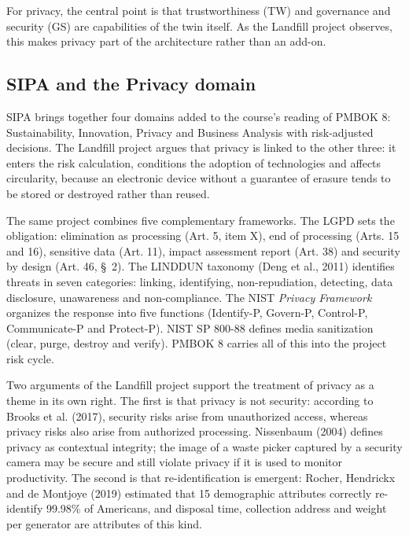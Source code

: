 \documentclass[12pt,a4paper,article,oneside,brazil,english]{abntex2}
\begin{document}
For privacy, the central point is that trustworthiness (TW) and governance and security (GS) are capabilities of the twin itself. As the Landfill project observes, this makes privacy part of the architecture rather than an add-on.

\subsection{SIPA and the Privacy domain}

SIPA brings together four domains added to the course's reading of PMBOK 8: Sustainability, Innovation, Privacy and Business Analysis with risk-adjusted decisions. The Landfill project argues that privacy is linked to the other three: it enters the risk calculation, conditions the adoption of technologies and affects circularity, because an electronic device without a guarantee of erasure tends to be stored or destroyed rather than reused.

The same project combines five complementary frameworks. The LGPD sets the obligation: elimination as processing (Art. 5, item X), end of processing (Arts. 15 and 16), sensitive data (Art. 11), impact assessment report (Art. 38) and security by design (Art. 46, \S~2). The LINDDUN taxonomy (Deng et al., 2011) identifies threats in seven categories: linking, identifying, non-repudiation, detecting, data disclosure, unawareness and non-compliance. The NIST \textit{Privacy Framework} organizes the response into five functions (Identify-P, Govern-P, Control-P, Communicate-P and Protect-P). NIST SP 800-88 defines media sanitization (clear, purge, destroy and verify). PMBOK 8 carries all of this into the project risk cycle.

Two arguments of the Landfill project support the treatment of privacy as a theme in its own right. The first is that privacy is not security: according to Brooks et al. (2017), security risks arise from unauthorized access, whereas privacy risks also arise from authorized processing. Nissenbaum (2004) defines privacy as contextual integrity; the image of a waste picker captured by a security camera may be secure and still violate privacy if it is used to monitor productivity. The second is that re-identification is emergent: Rocher, Hendrickx and de Montjoye (2019) estimated that 15 demographic attributes correctly re-identify 99.98\% of Americans, and disposal time, collection address and weight per generator are attributes of this kind.

\end{document}
